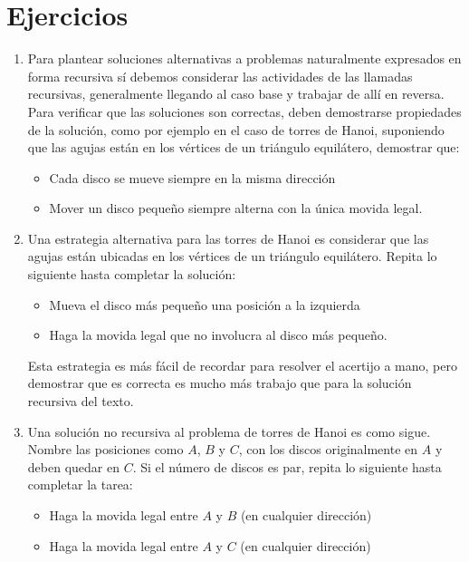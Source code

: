 \section*{Ejercicios}
\label{sec:ejercicios-13}

  \begin{enumerate}
  \item
    Para plantear soluciones alternativas
    a problemas naturalmente expresados en forma recursiva
    sí debemos considerar las actividades de las llamadas recursivas,
    generalmente llegando al caso base y trabajar de allí en reversa.
    Para verificar que las soluciones son correctas,
    deben demostrarse propiedades de la solución,
    como por ejemplo en el caso de torres de Hanoi,
    suponiendo que las agujas están en los vértices de un triángulo equilátero,
    demostrar que:
    \begin{itemize}
    \item
      Cada disco se mueve siempre en la misma dirección
    \item
      Mover un disco pequeño siempre alterna con la única movida legal.
    \end{itemize}
  \item
    Una estrategia alternativa para las torres de Hanoi
    es considerar que las agujas
    están ubicadas en los vértices de un triángulo equilátero.
    Repita lo siguiente hasta completar la solución:
    \begin{itemize}
    \item
      Mueva el disco más pequeño una posición a la izquierda
    \item
      Haga la movida legal que no involucra al disco más pequeño.
    \end{itemize}
    Esta estrategia es más fácil de recordar para resolver el acertijo a mano,
    pero demostrar que es correcta es mucho más trabajo
    que para la solución recursiva del texto.
  \item
    Una solución no recursiva al problema de torres de Hanoi
    es como sigue.
    Nombre las posiciones como \(A\), \(B\) y \(C\),
    con los discos originalmente en \(A\) y deben quedar en \(C\).
    Si el número de discos es par,
    repita lo siguiente hasta completar la tarea:
    \begin{itemize}
    \item
      Haga la movida legal entre \(A\) y \(B\)
      (en cualquier dirección)
    \item
      Haga la movida legal entre \(A\) y \(C\)
      (en cualquier dirección)

\end{itemize}
\end{enumerate}
